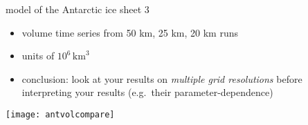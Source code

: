 \begin{frame}{model of the Antarctic ice sheet 3}

\normalsize
\begin{itemize}
\item volume time series from {\color{red} 50 km}, {\color{green} 25 km}, {\color{blue} 20 km} runs
\item units of $10^6\,\text{km}^3$
\item conclusion:  look at your results on \emph{multiple grid resolutions} before interpreting your results (e.g.~their parameter-dependence)
\end{itemize}

\bigskip
\begin{center}
\texttt{[image: antvolcompare]}
\end{center}
\end{frame}
